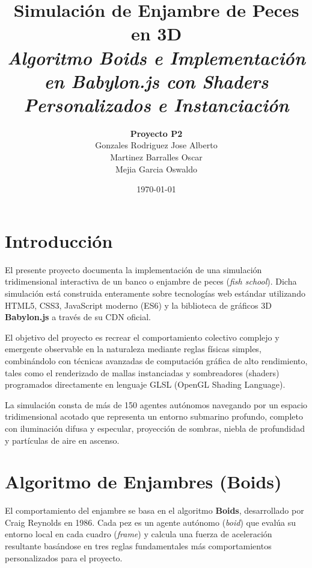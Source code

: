 \documentclass[12pt,a4paper]{article}
\title{
    \vspace{2cm}
    \Huge \textbf{Simulación de Enjambre de Peces en 3D} \\
    \vspace{0.5cm}
    \large \textit{Algoritmo Boids e Implementación en Babylon.js con Shaders Personalizados e Instanciación}
}
\author{
    \textbf{Proyecto P2} \\
    Gonzales Rodriguez Jose Alberto \\
    Martinez Barralles Oscar \\
    Mejia Garcia Oswaldo \\
    \vspace{1cm}
}
\date{\today}
\begin{document}
\maketitle
\thispagestyle{empty}
\newpage

\section{Introducción}
El presente proyecto documenta la implementación de una simulación tridimensional interactiva de un banco o enjambre de peces (\textit{fish school}). Dicha simulación está construida enteramente sobre tecnologías web estándar utilizando HTML5, CSS3, JavaScript moderno (ES6) y la biblioteca de gráficos 3D \textbf{Babylon.js} a través de su CDN oficial.

El objetivo del proyecto es recrear el comportamiento colectivo complejo y emergente observable en la naturaleza mediante reglas físicas simples, combinándolo con técnicas avanzadas de computación gráfica de alto rendimiento, tales como el renderizado de mallas instanciadas y sombreadores (shaders) programados directamente en lenguaje GLSL (OpenGL Shading Language).

La simulación consta de más de 150 agentes autónomos navegando por un espacio tridimensional acotado que representa un entorno submarino profundo, completo con iluminación difusa y especular, proyección de sombras, niebla de profundidad y partículas de aire en ascenso.

\newpage
\section{Algoritmo de Enjambres (Boids)}
El comportamiento del enjambre se basa en el algoritmo \textbf{Boids}, desarrollado por Craig Reynolds en 1986. Cada pez es un agente autónomo (\textit{boid}) que evalúa su entorno local en cada cuadro (\textit{frame}) y calcula una fuerza de aceleración resultante basándose en tres reglas fundamentales más comportamientos personalizados para el proyecto.
\end{document}
